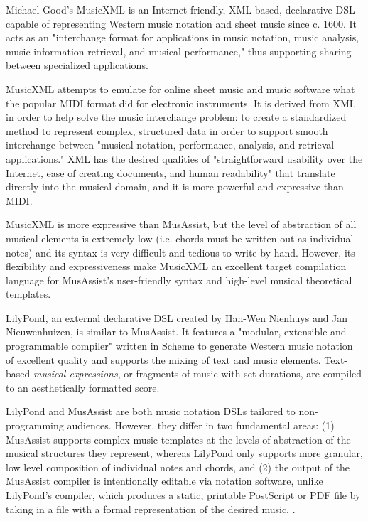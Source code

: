 \documentclass{article}
\begin{document}
Michael Good's MusicXML is an Internet-friendly, XML-based, declarative DSL capable of representing Western music 
notation and sheet music since c. 1600. 
It acts as an "interchange format for applications in music notation, music analysis, music information retrieval, 
and musical performance," thus supporting sharing between specialized applications. \cite{good_2013}

MusicXML attempts to emulate for online sheet music and music software what the popular MIDI format 
did for electronic instruments. It is derived from XML in order to help solve the music 
interchange problem: to create a standardized method to represent complex, structured data in order to support 
smooth interchange between "musical notation, performance, analysis, and retrieval applications." XML has the 
desired qualities of "straightforward usability over the Internet, ease of creating documents, and human readability" 
that translate directly into the musical domain, and it is more powerful and expressive 
than MIDI. \cite{good_2001}

MusicXML is more expressive than MusAssist, but the
level of abstraction of all musical elements is extremely low (i.e. chords must be written out 
as individual notes) and its syntax is very difficult and tedious to write by hand. However,
its flexibility and expressiveness make MusicXML an excellent target 
compilation language for MusAssist's user-friendly syntax and high-level musical theoretical templates.

LilyPond, an external declarative DSL created by Han-Wen Nienhuys and 
Jan Nieuwenhuizen, is similar to MusAssist. It features a "modular, extensible and programmable 
compiler" written in Scheme to generate Western music notation of excellent quality and supports the mixing of text and music elements. 
Text-based \textit{musical expressions}, or fragments of music with 
set durations, are compiled to an aesthetically formatted score.\cite{nienhuys_nieuwenhuizen_2003}

LilyPond and MusAssist are both music notation DSLs tailored to non-programming audiences. However, 
they differ in two fundamental areas: 
(1) MusAssist supports complex music templates at the levels of abstraction of the 
musical structures they represent, whereas LilyPond only supports 
more granular, low level composition of individual notes and chords, and (2) the output of the MusAssist compiler is intentionally editable via
notation software, unlike LilyPond's compiler, which produces a static, printable PostScript or PDF file by 
taking in a file with a formal representation of the desired music.
\cite{nienhuys_nieuwenhuizen_2003}.
\end{document}
